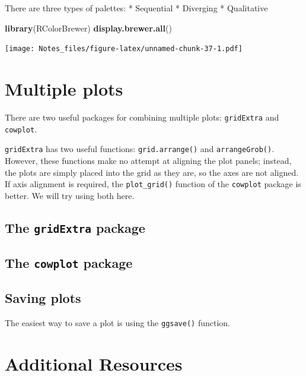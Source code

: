 \documentclass[
]{book}
\newenvironment{Shaded}{\begin{snugshade}}{\end{snugshade}}
\newcommand{\KeywordTok}[1]{\textcolor[rgb]{0.13,0.29,0.53}{\textbf{#1}}}
\newcommand{\NormalTok}[1]{#1}
\begin{document}
There are three types of palettes:
* Sequential
* Diverging
* Qualitative

\begin{Shaded}
\begin{Highlighting}[]
\KeywordTok{library}\NormalTok{(RColorBrewer)}
\KeywordTok{display.brewer.all}\NormalTok{()}
\end{Highlighting}
\end{Shaded}

\texttt{[image: Notes\_files/figure-latex/unnamed-chunk-37-1.pdf]}

\hypertarget{multiple-plots}{%
\section{Multiple plots}\label{multiple-plots}}

There are two useful packages for combining multiple plots: \texttt{gridExtra} and \texttt{cowplot}.

\texttt{gridExtra} has two useful functions: \texttt{grid.arrange()} and \texttt{arrangeGrob()}. However, these functions make no attempt at aligning the plot panels; instead, the plots are simply placed into the grid as they are, so the axes are not aligned. If axis alignment is required, the \texttt{plot\_grid()} function of the \texttt{cowplot} package is better. We will try using both here.

\hypertarget{the-gridextra-package}{%
\subsection{\texorpdfstring{The \texttt{gridExtra} package}{The gridExtra package}}\label{the-gridextra-package}}

\hypertarget{the-cowplot-package}{%
\subsection{\texorpdfstring{The \texttt{cowplot} package}{The cowplot package}}\label{the-cowplot-package}}

\hypertarget{saving-plots}{%
\subsection{Saving plots}\label{saving-plots}}

The easiest way to save a plot is using the \texttt{ggsave()} function.

\hypertarget{additional-resources}{%
\section{Additional Resources}\label{additional-resources}}
\end{document}
